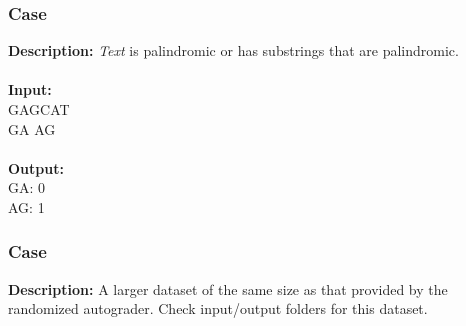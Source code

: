 \documentclass{article}
\newcommand{\code}[1]{{\fontfamily{pcr}\selectfont #1}}
\begin{document}
\subsubsection*{Case }
\hline \vspace{5}
\textbf{Description:}  \emph{Text} is palindromic or has substrings that are palindromic.\\ \\
\noindent \textbf{Input:}\\
\code{GAGCAT\\ GA AG}\\ \\
\noindent \textbf{Output:}\\
\code{GA: 0 \\ AG: 1}

\subsubsection*{Case }
\hline \vspace{5}
\textbf{Description:} A larger dataset of the same size as that provided by the randomized autograder. Check input/output folders for this dataset.\\ \\
\pagebreak
\end{document}
